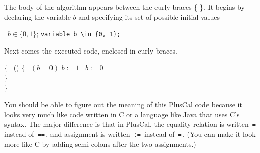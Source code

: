\documentclass[fleqn,leqno]{article}
\begin{document}
The body of the algorithm appears between the curly braces \{\,\,\}.
It begins by declaring the variable $b$ and specifying its set of
possible initial values%
\begin{twocols}
\variable\ $b \in 
\{0, 1\}$;
\midcol
\verb|variable b \in {0, 1};|
\end{twocols}
Next comes the executed code, enclosed in curly braces.%
\begin{display}
\begin{tabbing}
\{ \pwhile\ (\TRUE) \= \{ \pif\ $(b = 0)$ $b := 1$ \pelse\ $b := 0$
\\
\> \}\\
\}
\end{tabbing}
\end{display}
You should be able to figure out the meaning of this PlusCal code
because it looks very much like code written in C or a language like
Java that uses C's syntax.  The major difference is that in PlusCal,
the equality relation is written \,\verb|=|\, instead of
\,\verb|==|\,, and assignment is written \,\verb|:=|\, instead of
\,\verb|=|\,.  (You can make it look more like C by adding 
semi-colons after the two assignments.)
\end{document}
